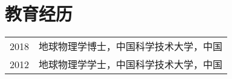 \section*{教育经历}
\begin{tabular}{p{} p{}}
2018 & 地球物理学博士，中国科学技术大学，中国 \\
2012 & 地球物理学学士，中国科学技术大学，中国
\end{tabular}
